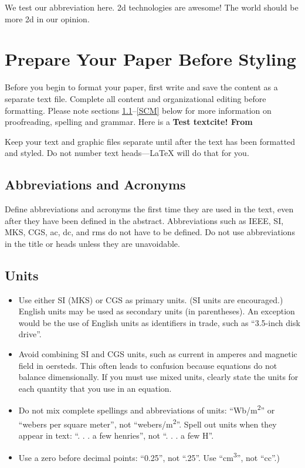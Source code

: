 \documentclass[conference]{IEEEtran}
\begin{document}
We test our abbreviation here. \gls{2d} technologies are awesome! The world should be more \gls{2d} in our opinion.
\section{Prepare Your Paper Before Styling}
Before you begin to format your paper, first write and save the content as a
separate text file. Complete all content and organizational editing before
formatting. Please note sections \ref{AA}--\ref{SCM} below for more information on
proofreading, spelling and grammar. Here is a \bf{Test textcite}! From \textcite{b1}

Keep your text and graphic files separate until after the text has been
formatted and styled. Do not number text heads---{\LaTeX} will do that
for you.

\subsection{Abbreviations and Acronyms}\label{AA}
Define abbreviations and acronyms the first time they are used in the text,
even after they have been defined in the abstract. Abbreviations such as
IEEE, SI, MKS, CGS, ac, dc, and rms do not have to be defined. Do not use
abbreviations in the title or heads unless they are unavoidable.

\subsection{Units}
\begin{itemize}
    \item Use either SI (MKS) or CGS as primary units. (SI units are encouraged.) English units may be used as secondary units (in parentheses). An exception would be the use of English units as identifiers in trade, such as ``3.5-inch disk drive''.
    \item Avoid combining SI and CGS units, such as current in amperes and magnetic field in oersteds. This often leads to confusion because equations do not balance dimensionally. If you must use mixed units, clearly state the units for each quantity that you use in an equation.
    \item Do not mix complete spellings and abbreviations of units: ``Wb/m\textsuperscript{2}'' or ``webers per square meter'', not ``webers/m\textsuperscript{2}''. Spell out units when they appear in text: ``. . . a few henries'', not ``. . . a few H''.
    \item Use a zero before decimal points: ``0.25'', not ``.25''. Use ``cm\textsuperscript{3}'', not ``cc''.)
\end{itemize}
\end{document}

